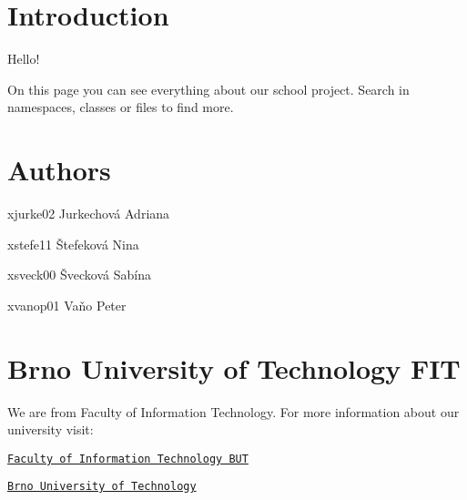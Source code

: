 \hypertarget{index_intro_sec}{}\section{Introduction}\label{index_intro_sec}
Hello!

On this page you can see everything about our school project. Search in namespaces, classes or files to find more.\hypertarget{index_authors_sec}{}\section{Authors}\label{index_authors_sec}
xjurke02 Jurkechová Adriana

xstefe11 Štefeková Nina

xsveck00 Švecková Sabína

xvanop01 Vaňo Peter\hypertarget{index_school_sec}{}\section{Brno University of Technology F\+IT}\label{index_school_sec}
We are from Faculty of Information Technology. For more information about our university visit\+:

\href{https://www.fit.vut.cz/.en}{\tt Faculty of Information Technology B\+UT}

\href{https://www.vutbr.cz/en/}{\tt Brno University of Technology} 